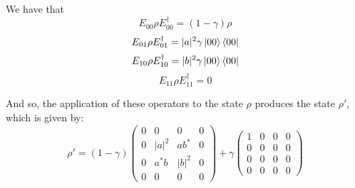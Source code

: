 \documentclass{masterthesis}
\begin{document}

We have that
\begin{equation}
    E_{00} \rho E_{00}^{\dagger} = (1-\gamma) \rho
\end{equation}
\begin{equation}
    E_{01} \rho E_{01}^{\dagger} = |a|^2 \gamma \ket{00}\bra{00}
\end{equation}
\begin{equation}
    E_{10} \rho E_{10}^{\dagger} = |b|^2 \gamma \ket{00}\bra{00}
\end{equation}
\begin{equation}
    E_{11} \rho E_{11}^{\dagger} = 0
\end{equation}

And so, the application of these operators to the state $\rho$ produces the state $\rho'$, which is given by:
\begin{equation}\label{eq:ad-dual-rail}
    \rho' = (1-\gamma)\begin{pmatrix} 0 & 0 & 0 & 0 \\ 0 & |a|^{2} & a b^{*} & 0 \\ 0 & a^{*} b & |b|^{2} & 0 \\ 0 & 0 & 0 & 0 \end{pmatrix} + \gamma\begin{pmatrix} 1 & 0 & 0 & 0 \\ 0 & 0 & 0 & 0 \\ 0 & 0 & 0 & 0 \\ 0 & 0 & 0 & 0 \end{pmatrix}
\end{equation}
\end{document}
